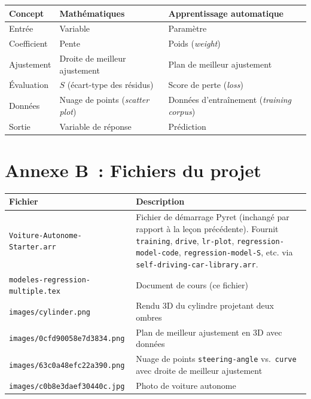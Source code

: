 \documentclass[12pt,a4paper]{article}
\begin{document}
\begin{center}
\begin{tabularx}{\textwidth}{l X X}
  \toprule
  \textbf{Concept} & \textbf{Mathématiques} & \textbf{Apprentissage automatique} \\
  \midrule
  Entrée       & Variable        & Paramètre \\
  Coefficient  & Pente           & Poids (\emph{weight}) \\
  Ajustement   & Droite de meilleur ajustement & Plan de meilleur ajustement \\
  Évaluation   & $S$ (écart-type des résidus) & Score de perte (\emph{loss}) \\
  Données      & Nuage de points (\emph{scatter plot}) & Données d'entraînement (\emph{training corpus}) \\
  Sortie       & Variable de réponse & Prédiction \\
  \bottomrule
\end{tabularx}
\end{center}

\section*{Annexe B~: Fichiers du projet}

\begin{center}
\begin{tabularx}{\textwidth}{l X}
  \toprule
  \textbf{Fichier} & \textbf{Description} \\
  \midrule
  \texttt{Voiture\allowbreak-Autonome\allowbreak-Starter.arr} & Fichier de démarrage Pyret (inchangé par rapport à la leçon précédente). Fournit \texttt{training}, \texttt{drive}, \texttt{lr-plot}, \texttt{regression\allowbreak-model\allowbreak-code}, \texttt{regression\allowbreak-model\allowbreak-S}, etc. via \texttt{self\allowbreak-driving\allowbreak-car\allowbreak-library.arr}. \\
  \texttt{modeles-regression-multiple.tex} & Document de cours (ce fichier) \\
  \texttt{images/cylinder.png} & Rendu 3D du cylindre projetant deux ombres \\
  \texttt{images/0cfd90058e7d3834.png} & Plan de meilleur ajustement en 3D avec données \\
  \texttt{images/63c0a48efc22a390.png} & Nuage de points \texttt{steering-angle} vs.\ \texttt{curve} avec droite de meilleur ajustement \\
  \texttt{images/c0b8e3daef30440c.jpg} & Photo de voiture autonome \\
  \bottomrule
\end{tabularx}
\end{center}
\end{document}

